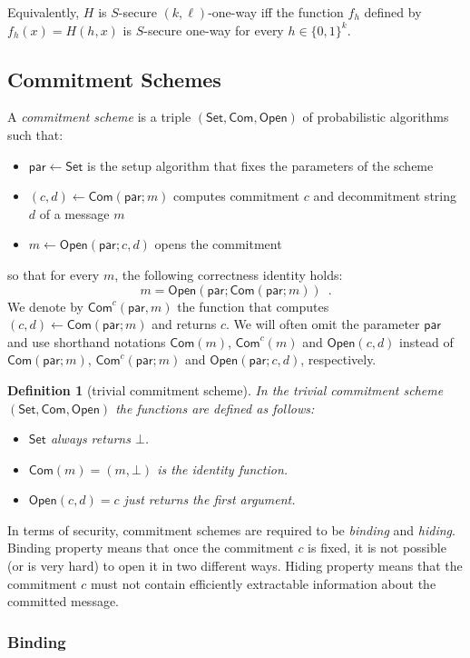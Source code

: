 \documentclass{article}
\newtheorem{definition}{Definition}[section]
\newcommand{\setup}[0]{\mathsf{Set}}
\newcommand{\commit}[0]{\mathsf{Com}}
\newcommand{\open}[0]{\mathsf{Open}}
\newcommand{\commitc}[0]{\mathsf{Com}^{c}}
\newcommand{\param}[0]{\mathsf{par}}
\begin{document}
\noindent Equivalently, $H$ is $S$-secure $(k,\ell)$-one-way iff the function $f_h$ defined by $f_h(x)=H(h,x)$ is $S$-secure one-way for every $h\in\{0,1\}^k$.

\subsection{Commitment Schemes}

A \emph{commitment scheme} is a triple $(\setup, \commit, \open)$ of probabilistic algorithms such that:
\begin{itemize}
\item $\param\gets\setup$ is the setup algorithm that fixes the parameters of the scheme
\item $(c,d)\gets \commit(\param; m)$ computes commitment $c$ and
decommitment string $d$ of a message $m$
\item $m\gets \open(\param; c, d)$ opens the commitment
\end{itemize}
so that for every $m$, the following correctness identity holds:
\[
m=\open(\param; \commit(\param; m))\enspace.
\]
We denote by $\commitc(\param,m)$ the function that computes $(c,d)\gets \commit(\param; m)$ and returns $c$.
We will often omit the parameter $\param$ and use shorthand notations $\commit(m)$, $\commitc(m)$ and $\open(c,d)$ instead of $\commit(\param; m)$,
$\commitc(\param; m)$ and $\open(\param; c, d)$, respectively.
\medskip

\begin{definition}[trivial commitment scheme]
In the trivial commitment scheme $(\setup,\commit,\open)$ the functions are defined as follows:
\begin{itemize}
\item $\setup$ always returns $\bot$.
\item $\commit(m)=(m,\bot)$ is the identity function.
\item $\open (c,d) = c$ just returns the first argument.
\end{itemize}
\end{definition}

\noindent In terms of security, commitment schemes are required to be \emph{binding} and \emph{hiding}. Binding property means that once the commitment $c$ is fixed, it is not possible (or is very hard) to open it in two different ways. Hiding property means that the commitment $c$ must not contain efficiently extractable information about the committed message.

\subsubsection{Binding}
\end{document}
